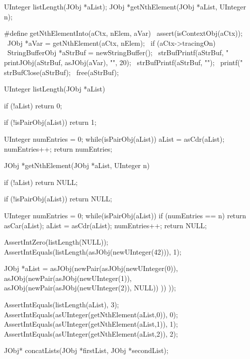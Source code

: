 
\startCHeader
UInteger listLength(JObj *aList);
JObj    *getNthElement(JObj *aList, UInteger n);

#define getNthElementInto(aCtx, nElem, aVar)    \
assert(isContextObj(aCtx));                     \
JObj *aVar = getNthElement(aCtx, nElem);        \
if (aCtx->tracingOn) {                          \
  StringBufferObj *aStrBuf = newStringBuffer(); \
  strBufPrintf(aStrBuf, "%
  printJObj(aStrBuf, asJObj(aVar), "", 20);     \
  strBufPrintf(aStrBuf, "\n");                  \
  printf("%
  strBufClose(aStrBuf);                         \
  free(aStrBuf);                                \
}

\stopCHeader

\startCCode
UInteger listLength(JObj *aList) {
  if (!aList) return 0;
  
  if (!isPairObj(aList)) return 1;
  
  UInteger numEntries = 0;
  while(isPairObj(aList)) {
    aList = asCdr(aList);
    numEntries++;
  }
  return numEntries;
}

JObj *getNthElement(JObj *aList, UInteger n) {
  if (!aList) return NULL;
  
  if (!isPairObj(aList)) return NULL;
  
  UInteger numEntries = 0;
  while(isPairObj(aList)) {
    if (numEntries == n) return asCar(aList);
    aList = asCdr(aList);
    numEntries++;
  }
  return NULL;
}
\stopCCode


\startCTest
  AssertIntZero(listLength(NULL));
  AssertIntEquals(listLength(asJObj(newUInteger(42))), 1);

  JObj *aList =
    asJObj(newPair(asJObj(newUInteger(0)), 
      asJObj(newPair(asJObj(newUInteger(1)),
        asJObj(newPair(asJObj(newUInteger(2)), NULL))
      ))
    ));
  
  AssertIntEquals(listLength(aList), 3);
  AssertIntEquals(asUInteger(getNthElement(aList,0)), 0);
  AssertIntEquals(asUInteger(getNthElement(aList,1)), 1);
  AssertIntEquals(asUInteger(getNthElement(aList,2)), 2);
\stopCTest
\stopTestCase
\stopTestSuite

\startTestSuite[concatLists]

\startCHeader
JObj* concatLists(JObj *firstList, JObj *secondList);
\stopCHeader

